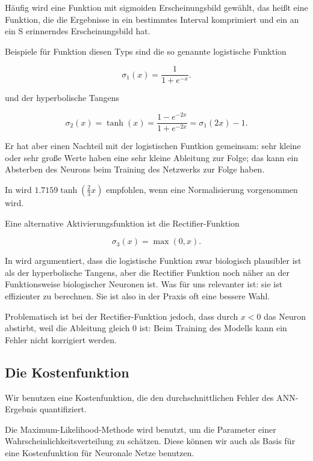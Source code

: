 Häufig wird eine Funktion mit sigmoiden Erscheinungsbild gewählt, das heißt eine Funktion, die die Ergebnisse in ein bestimmtes Interval komprimiert und ein an ein S erinnerndes Erscheinungsbild hat. 

Beispiele für Funktion diesen Typs sind die so genannte logistische Funktion

\begin{equation}
\sigma_1(x) = \frac{1}{1+e^{-x}}.
\end{equation}

und der hyperbolische Tangens

\begin{equation}
\sigma_2(x) = \tanh(x) = \frac{1-e^{-2x}}{1+e^{-2x}} = 
\sigma_1(2x) -1.
\end{equation}

Er hat aber einen Nachteil mit der logistischen Funtkion gemeinsam: sehr kleine oder sehr große Werte haben eine sehr kleine Ableitung zur Folge; das kann ein Absterben des Neurons beim Training des Netzwerks zur Folge haben. 

In \cite{lecunefficient} wird $1.7159 \tanh(\frac{2}{3} x)$ empfohlen, wenn eine Normalisierung vorgenommen wird. 

Eine alternative Aktivierungsfunktion ist die Rectifier-Funktion 

\begin{equation}
\sigma_3(x) = \max(0,x).
\end{equation} 

In \cite{glorot2011deep} wird argumentiert, dass die logistische Funktion zwar biologisch plausibler ist als der hyperbolische Tangens, aber die Rectifier Funktion noch näher an der Funktionsweise biologischer Neuronen ist. Was für uns relevanter ist: sie ist effizienter zu berechnen. Sie ist also in der Praxis oft eine bessere Wahl. 

Problematisch ist bei der Rectifier-Funktion jedoch, dass durch $x < 0$ das Neuron abstirbt, weil die Ableitung gleich 0 ist: Beim Training des Modells kann ein Fehler nicht korrigiert werden\cite{bengio2012practical}.

\subsection{Die Kostenfunktion}
Wir benutzen eine Kostenfunktion, die den durchschnittlichen Fehler des ANN-Ergebnis quantifiziert.

Die Maximum-Likelihood-Methode wird benutzt, um die Parameter einer Wahrscheinlichkeitsverteilung zu schätzen. Diese können wir auch als Basis für eine Kostenfunktion für Neuronale Netze benutzen.

